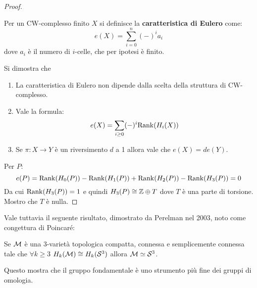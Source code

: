 \begin{proof}
  \begin{definition}
    Per un CW-complesso finito $ X $ si definisce la \textbf{caratteristica di Eulero}
    come:
    \[
      e(X) = \sum_{i = 0}^n (-)^i a_i
    \]
    dove $ a_i $ è il numero di $ i $-celle, che per ipotesi è finito.
  \end{definition}
  Si dimostra che
  \begin{enumerate}
  \item La caratteristica di Eulero non dipende dalla scelta della struttura
    di CW-complesso.
  \item Vale la formula:
    \[
      e(X) = \sum_{i\geq0}(-)^i \mathrm{Rank}( H_i(X) )
    \]
  \item Se $ \pi \colon X \to Y $ è un riversimento $ d $ a 1 allora vale che $ e(X) = d e(Y) $.
  \end{enumerate}
  Per $ P $:
  \[
    e(P) = \mathrm{Rank}( H_0(P) ) - \mathrm{Rank}( H_1(P) ) + \mathrm{Rank}( H_2(P) ) - \mathrm{Rank}( H_3(P) ) = 0
  \]
  Da cui $ \mathrm{Rank}( H_3(P) ) = 1 $ e quindi $ H_3(P) \cong \mathbb{Z} \oplus T $ dove $ T $ è una parte
  di torsione. Mostro che $ T $ è nulla.
\end{proof}

Vale tuttavia il seguente risultato, dimostrato da Perelman nel 2003,
noto come congettura di Poincaré:
\begin{proposition}
  Se $ \mathcal{M} $ è una $ 3 $-varietà topologica compatta, connessa e semplicemente
  connessa tale che $ \forall k \geq 3 $ $ H_k(\mathcal{M}) \cong H_k(\mathcal{S}^{3}) $ allora $ \mathcal{M} \simeq \mathcal{S}^{3} $.
\end{proposition}
Questo mostra che il gruppo fondamentale è uno strumento più fine
dei gruppi di omologia.




